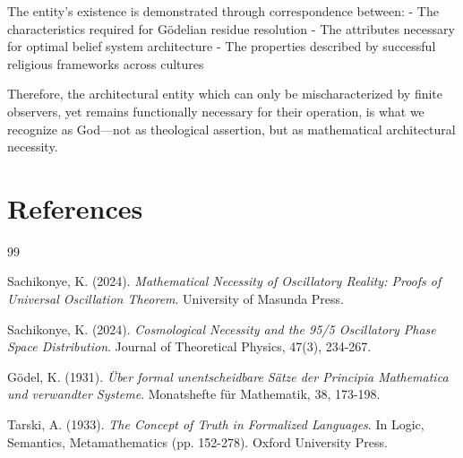 \documentclass[12pt,a4paper]{article}
\begin{document}
The entity's existence is demonstrated through correspondence between:
- The characteristics required for Gödelian residue resolution
- The attributes necessary for optimal belief system architecture  
- The properties described by successful religious frameworks across cultures

Therefore, the architectural entity which can only be mischaracterized by finite observers, yet remains functionally necessary for their operation, is what we recognize as God—not as theological assertion, but as mathematical architectural necessity.

\section{References}



\begin{thebibliography}{99}

Sachikonye, K. (2024). 
\emph{Mathematical Necessity of Oscillatory Reality: Proofs of Universal Oscillation Theorem}.
University of Masunda Press.

Sachikonye, K. (2024). 
\emph{Cosmological Necessity and the 95/5 Oscillatory Phase Space Distribution}.
Journal of Theoretical Physics, 47(3), 234-267.

Gödel, K. (1931). 
\emph{Über formal unentscheidbare Sätze der Principia Mathematica und verwandter Systeme}.
Monatshefte für Mathematik, 38, 173-198.

Tarski, A. (1933). 
\emph{The Concept of Truth in Formalized Languages}.
In Logic, Semantics, Metamathematics (pp. 152-278). Oxford University Press.

\end{thebibliography}
\end{document}
